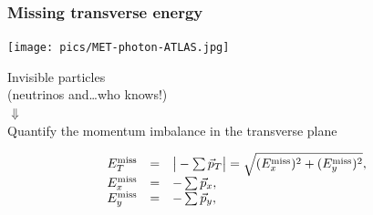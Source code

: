 \begin{frame}\frametitle{Missing transverse energy}
\centering\myskip


\begin{minipage}{.6\textwidth}\centering
\texttt{[image: pics/MET-photon-ATLAS.jpg]}\\

\end{minipage}\begin{minipage}{.4\textwidth}\centering

Invisible particles\\
{\footnotesize (neutrinos and\dots who knows!)}\\
{\Large$\Downarrow$}\\
Quantify the momentum imbalance in the transverse plane

\end{minipage}

$$\begin{array}{lcl}
E^{\rm miss}_{T} & = & \big|-\sum\vec{p}_T \big| = \sqrt{(E^{\rm miss}_{x})^2 + (E^{\rm miss}_{y})^2} ,\\
E^{\rm miss}_{x} & = & -\sum\vec{p}_x ,\\
E^{\rm miss}_{y} & = & -\sum\vec{p}_y ,\\
\end{array}$$



\end{frame}

